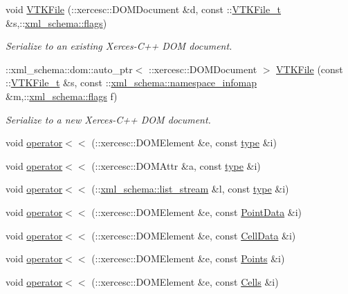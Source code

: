 \begin{DoxyCompactItemize}
void \hyperlink{vtk-unstructured_8cpp_a5303826a26dc8b0981ea314365205514}{V\+T\+K\+File} (\+::xercesc\+::\+D\+O\+M\+Document \&d, const \+::\hyperlink{classVTKFile__t}{V\+T\+K\+File\+\_\+t} \&s,\+::\hyperlink{namespacexml__schema_a8d981c127a1f5106d04ad5853e707361}{xml\+\_\+schema\+::flags})
\begin{DoxyCompactList}\small\item\em Serialize to an existing Xerces-\/\+C++ D\+O\+M document. \end{DoxyCompactList}\item 
\+::xml\+\_\+schema\+::dom\+::auto\+\_\+ptr$<$ \+::xercesc\+::\+D\+O\+M\+Document $>$ \hyperlink{vtk-unstructured_8cpp_a6e2336ff7eefc4b5fd245cc8c12815c6}{V\+T\+K\+File} (const \+::\hyperlink{classVTKFile__t}{V\+T\+K\+File\+\_\+t} \&s, const \+::\hyperlink{namespacexml__schema_ad52b6e3505153cb30ba3452f7868450e}{xml\+\_\+schema\+::namespace\+\_\+infomap} \&m,\+::\hyperlink{namespacexml__schema_a8d981c127a1f5106d04ad5853e707361}{xml\+\_\+schema\+::flags} f)
\begin{DoxyCompactList}\small\item\em Serialize to a new Xerces-\/\+C++ D\+O\+M document. \end{DoxyCompactList}\item 
void \hyperlink{vtk-unstructured_8cpp_a39982a892c5c712b9ceaf5451fc6f4ad}{operator$<$$<$} (\+::xercesc\+::\+D\+O\+M\+Element \&e, const \hyperlink{classtype}{type} \&i)
\item 
void \hyperlink{vtk-unstructured_8cpp_a4fb8d54838ba8178be88528f342c8b27}{operator$<$$<$} (\+::xercesc\+::\+D\+O\+M\+Attr \&a, const \hyperlink{classtype}{type} \&i)
\item 
void \hyperlink{vtk-unstructured_8cpp_abc84c964f7011b68cb249e0dd527a052}{operator$<$$<$} (\+::\hyperlink{namespacexml__schema_ab6c818ac91e70a25620375e0d000be83}{xml\+\_\+schema\+::list\+\_\+stream} \&l, const \hyperlink{classtype}{type} \&i)
\item 
void \hyperlink{vtk-unstructured_8cpp_a03c700ca3f77780311236cfbb43b28a6}{operator$<$$<$} (\+::xercesc\+::\+D\+O\+M\+Element \&e, const \hyperlink{classPointData}{Point\+Data} \&i)
\item 
void \hyperlink{vtk-unstructured_8cpp_a9000f9f93a0e3f8c8a2d0de1ddae77c8}{operator$<$$<$} (\+::xercesc\+::\+D\+O\+M\+Element \&e, const \hyperlink{classCellData}{Cell\+Data} \&i)
\item 
void \hyperlink{vtk-unstructured_8cpp_a155fa88f0f3a3fb5f55f06539205ef01}{operator$<$$<$} (\+::xercesc\+::\+D\+O\+M\+Element \&e, const \hyperlink{classPoints}{Points} \&i)
\item 
void \hyperlink{vtk-unstructured_8cpp_a043b0bbda942e0878ce7a8f63ddefe79}{operator$<$$<$} (\+::xercesc\+::\+D\+O\+M\+Element \&e, const \hyperlink{classCells}{Cells} \&i)
\end{DoxyCompactItemize}


